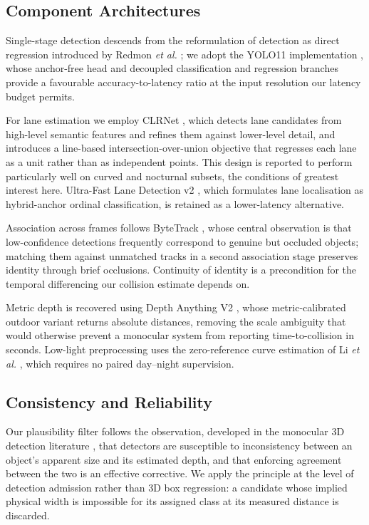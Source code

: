 \documentclass[conference]{IEEEtran}
\begin{document}
\subsection{Component Architectures}

Single-stage detection descends from the reformulation of detection as direct
regression introduced by Redmon \textit{et al.} \cite{redmon2016yolo}; we adopt
the YOLO11 implementation \cite{ultralytics2024yolo11}, whose anchor-free head
and decoupled classification and regression branches provide a favourable
accuracy-to-latency ratio at the input resolution our latency budget permits.

For lane estimation we employ CLRNet \cite{zheng2022clrnet}, which detects lane
candidates from high-level semantic features and refines them against
lower-level detail, and introduces a line-based intersection-over-union
objective that regresses each lane as a unit rather than as independent points.
This design is reported to perform particularly well on curved and nocturnal
subsets, the conditions of greatest interest here. Ultra-Fast Lane Detection v2
\cite{qin2024ufldv2}, which formulates lane localisation as hybrid-anchor ordinal
classification, is retained as a lower-latency alternative.

Association across frames follows ByteTrack \cite{zhang2022bytetrack}, whose
central observation is that low-confidence detections frequently correspond to
genuine but occluded objects; matching them against unmatched tracks in a second
association stage preserves identity through brief occlusions. Continuity of
identity is a precondition for the temporal differencing our collision estimate
depends on.

Metric depth is recovered using Depth Anything V2 \cite{yang2024depthv2}, whose
metric-calibrated outdoor variant returns absolute distances, removing the scale
ambiguity that would otherwise prevent a monocular system from reporting
time-to-collision in seconds. Low-light preprocessing uses the zero-reference
curve estimation of Li \textit{et al.} \cite{li2021zerodce}, which requires no
paired day--night supervision.

\subsection{Consistency and Reliability}

Our plausibility filter follows the observation, developed in the monocular 3D
detection literature \cite{lian2022geoconsistency}, that detectors are
susceptible to inconsistency between an object's apparent size and its estimated
depth, and that enforcing agreement between the two is an effective corrective.
We apply the principle at the level of detection admission rather than 3D box
regression: a candidate whose implied physical width is impossible for its
assigned class at its measured distance is discarded.
\end{document}
